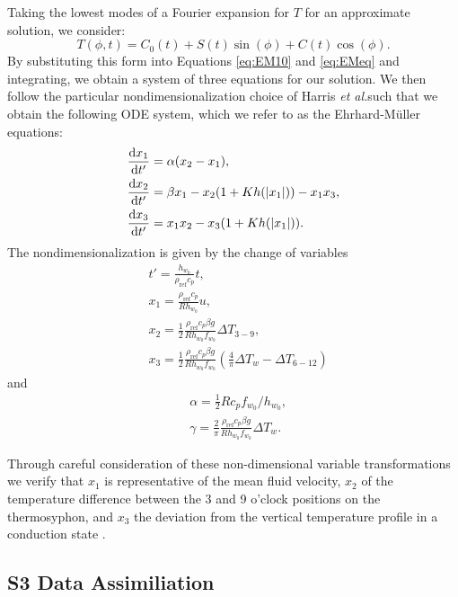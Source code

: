 \documentclass[pre,twocolumn,twoside,byrevtex,superscriptaddress]{revtex4}
\newcommand{\etal}{\textit{et al.}}
\newcommand{\diff}[2]{\frac{{\rm d}#1}{{\rm d}#2}}
\newcommand{\rhoref}{\rho_{\text{ref}}}
\begin{document}
Taking the lowest modes of a Fourier expansion for $T$ for an approximate solution, we consider:
\begin{equation} T(\phi , t) = C_0 (t) + S(t) \sin (\phi ) + C(t) \cos (\phi) . \end{equation}
By substituting this form into Equations \ref{eq:EM10} and \ref{eq:EMeq} and integrating, we obtain a system of three equations for our solution.
We then follow the particular nondimensionalization choice of Harris \etal such that we obtain the following ODE system, which we refer to as the Ehrhard-M\"{u}ller equations:
\begin{align}
& \diff{x_1}{t'} = \alpha (x_2 - x_1),\\
& \diff{x_2}{t'} = \beta x_1 - x_2 (1 + Kh(|x_1|)) - x_1x_3,\\
& \diff{x_3}{t'} = x_1x_2 - x_3 (1 + Kh(|x_1|)) .\end{align}
The nondimensionalization is given by the change of variables
\begin{align}
& t' = \frac{h_{w_0}}{\rhoref c_p}t,\\
& x_1 = \frac{\rhoref c_p }{R h_{w_0}} u, \\
& x_2 = \frac{1}{2} \frac{\rhoref c_p \beta g}{ R h_{w_0} f_{w_0}} \Delta T_{3-9}, \\
& x_3 = \frac{1}{2} \frac{\rhoref c_p \beta g}{ R h_{w_0} f_{w_0}} \left ( \frac{4}{\pi} \Delta T_w - \Delta T_{6-12} \right ) 
\end{align}
and
\begin{align}
& \alpha = \frac{1}{2} R c_p f_{w_0} / h_{w_0} ,\\
& \gamma = \frac{2}{\pi} \frac{\rhoref c_p \beta g}{Rh_{w_0} f_{w_0}} \Delta T_w. \end{align}

Through careful consideration of these non-dimensional variable transformations we verify that $x_1$ is representative of the mean fluid velocity, $x_2$ of the temperature difference between the 3 and 9 o'clock positions on the thermosyphon, and $x_3$ the deviation from the vertical temperature profile in a conduction state \cite{harris2011predicting}.

\clearpage
\pagebreak
\subsection*{S3 Data Assimiliation}
\label{S3}
\end{document}
